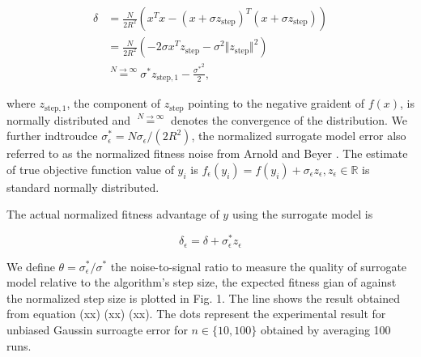 $$
\begin{aligned}
\delta & = \frac{N}{2R^2} (x^Tx - (x+\sigma z_{\text{step}})^T (x+\sigma z_{\text{step}})) \\
& = \frac{N}{2R^2} (-2 \sigma x^Tz_{\text{step}} - \sigma^2 \Vert z_{\text{step}}\Vert^2 ) \\
& \overset{N \rightarrow \infty}{=} \sigma^* z_{\text{step},1} - \frac{{\sigma^*} ^2}{2},
\end{aligned}
$$


where $z_{\text{step},1} $, the component of $z_{\text{step}}$ pointing to the negative graident of $f(x)$, is normally distributed and $\overset{N \rightarrow \infty}{=}$ denotes the convergence of the distribution. We further indtroudce $\sigma_\epsilon^* = N \sigma_\epsilon / (2R^2)$, the normalized surrogate model error also referred to as the normalized fitness noise from Arnold and Beyer \cite{1284729}. The estimate of true objective function value of $y_i$ is $f_\epsilon (y_i) = f(y_i) + \sigma_\epsilon z_\epsilon, z_\epsilon \in \mathbb{R}$ is standard normally distributed.

The actual normalized fitness advantage of $y$ using the surrogate model is 

$$\delta_\epsilon = \delta+\sigma_\epsilon^* z_\epsilon$$






We define $\theta = \sigma_\epsilon^* / \sigma^*$ the noise-to-signal ratio to measure the quality of surrogate model relative to the algorithm's step size, the expected fitness gian of against the normalized step size is plotted in Fig. 1. The line shows the result obtained from equation (xx) (xx) (xx). The dots represent the experimental result for unbiased Gaussin surroagte error for $n \in \{10,100 \}$ obtained by averaging 100 runs.





